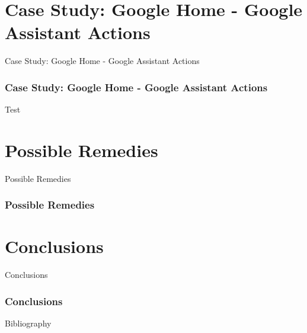 \documentclass{beamer}
\begin{document}
\section{Case Study: Google Home - Google Assistant Actions}

\begin{frame}
\begin{center} 
	 Case Study: Google Home - Google Assistant Actions
\end{center}
\end{frame}

\begin{frame}
\frametitle{Case Study: Google Home - Google Assistant Actions}
Test
\end{frame}

\section{Possible Remedies}

\begin{frame}
\begin{center} 
	 Possible Remedies
\end{center}
\end{frame}

\begin{frame}
\frametitle{Possible Remedies}

\end{frame}

\section{Conclusions}

\begin{frame}
\begin{center} 
	 Conclusions
\end{center}
\end{frame}

\begin{frame}
\frametitle{Conclusions}
\end{frame}

\nocite{*}
\begin{frame}{Bibliography}
\renewcommand*{\bibfont}{\footnotesize}
\printbibliography
\end{frame}
\end{document}
